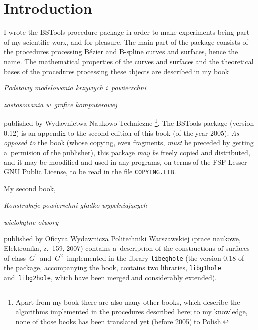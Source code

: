 \section{Introduction}

I wrote the BSTools procedure package in order to make experiments
being part of my scientific work, and for pleasure. The main part of the package
consists of the procedures processing B\'{e}zier and B-spline curves and
surfaces, hence the name. The mathematical properties of the curves and surfaces
and the theoretical bases of the procedures processing these objects
are described in my book

\vspace{\medskipamount}
\centerline{\large\emph{Podstawy modelowania krzywych i~powierzchni}}
\vspace{\smallskipamount}
\centerline{\large\emph{zastosowania w~grafice komputerowej}}

\vspace{\medskipamount}
\noindent
published by Wydawnictwa Naukowo-Techniczne%
\footnote{%
Apart from my book there are also many other books, which describe the
algorithms implemented in the procedures described here; to my knowledge,
none of those books has been translated yet (before 2005) to Polish.}.
The BSTools package (version 0{.}12)
is an appendix to the second edition of this book (of the year 2005).
\emph{As opposed to} the book (whose copying, even fragments, \emph{must}
be preceded by getting a~permision of the publisher),
this package \emph{may be} freely copied and distributed, and
it may be moodified and used in any programs, on terms of the
FSF Lesser GNU Public License, to be read in the file
\texttt{COPYING.LIB}.

My second book,

\vspace{\medskipamount}
\centerline{\large\emph{Konstrukcje powierzchni g{\l}adko wype{\l}niaj{\k a}cych}}
\vspace{\smallskipamount}
\centerline{\large\emph{wielok{\k a}tne otwory}}

\vspace{\medskipamount}
\noindent
published by Oficyna Wydawnicza Politechniki Warszawskiej (prace naukowe,
Elektronika, z.~159, 2007) contains a~description of the constructions
of surfaces of class~$G^1$ and~$G^2$, implemented in the library
\texttt{libeghole} (the version 0.18 of the package, accompanying the book,
contains two libraries, \texttt{libg1hole} and~\texttt{libg2hole},
which have been merged and considerably extended).

